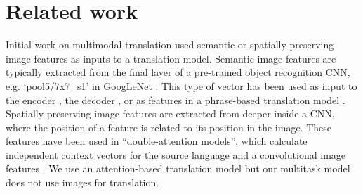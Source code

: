 \section{Related work}



Initial work on multimodal translation used semantic or spatially-preserving image features as inputs to a translation model. Semantic image features are typically extracted from the final layer of a pre-trained object recognition CNN, e.g.
`pool5/7x7\_s1' in GoogLeNet \cite{Szegedy2015}. This type of vector has been used as input to the encoder \cite{ElliottFrankHasler2015,Huang2016}, the decoder \cite{Libovicky2016}, or as features in a phrase-based
translation model \cite{Shah2016,Hitschler2016}.
Spatially-preserving image features are extracted from deeper inside a CNN, where the position of a feature is related to its position in the image. These features have
been used in ``double-attention models'', which calculate independent context vectors for the source language and a
convolutional image features
\cite{Calixto2016,Caglayan2016b,Calixto2017c}.
We use an attention-based translation model but our multitask model does not use images for translation.


